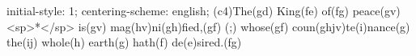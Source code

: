 initial-style: 1;
centering-scheme: english;
(c4)The(gd) King(fe) of(fg) peace(gv) <sp>*</sp> is(gv) mag(hv)ni(gh)fied,(gf) (;) whose(gf) coun(ghjv)te(i)nance(g) the(ij) whole(h) earth(g) hath(f) de(e)sired.(fg)
